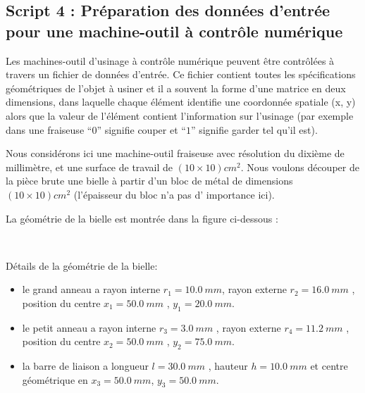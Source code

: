 \documentclass{article}
\begin{document}
    \subsection{Script 4 : Préparation des données d'entrée pour une
machine-outil à contrôle
numérique}\label{script-4-pruxe9paration-des-donnuxe9es-dentruxe9e-pour-une-machine-outil-uxe0-contruxf4le-numuxe9rique}

    Les machines-outil d'usinage à contrôle numérique peuvent être
contrôlées à travers un fichier de données d'entrée. Ce fichier contient
toutes les spécifications géométriques de l'objet à usiner et il a
souvent la forme d'une matrice en deux dimensions, dans laquelle chaque
élément identifie une coordonnée spatiale (x, y) alors que la valeur de
l'élément contient l'information sur l'usinage (par exemple dans une
fraiseuse ``\(0\)'' signifie couper et ``\(1\)'' signifie garder tel
qu'il est).

Nous considérons ici une machine-outil fraiseuse avec résolution du
dixième de millimètre, et une surface de travail de
\((10 \times 10) cm^2\). Nous voulons découper de la pièce brute une
bielle à partir d'un bloc de métal de dimensions \((10 \times 10) cm^2\)
(l'épaisseur du bloc n'a pas d' importance ici).

La géométrie de la bielle est montrée dans la figure ci-dessous :

    \begin{center}
    \end{center}
    { \hspace*{\fill} \\}
    

    Détails de la géométrie de la bielle:

\begin{itemize}
\item
  le grand anneau a rayon interne \(r_1 = 10.0\ mm\), rayon externe
  \(r_2 = 16.0\ mm\) , position du centre \(x_1 = 50.0 \ mm\) ,
  \(y_1 = 20.0 \ mm\).
\item
  le petit anneau a rayon interne \(r_3 = 3.0\ mm\) , rayon externe
  \(r_4 = 11.2\ mm\) , position du centre \(x_2 = 50.0 \ mm\) ,
  \(y_2 = 75.0 \ mm\).
\item
  la barre de liaison a longueur \(l=30.0\ mm\) , hauteur
  \(h = 10.0\ mm\) et centre géométrique en \(x_3 = 50.0 \ mm\),
  \(y_3 = 50.0 \ mm\).
\end{itemize}
\end{document}
